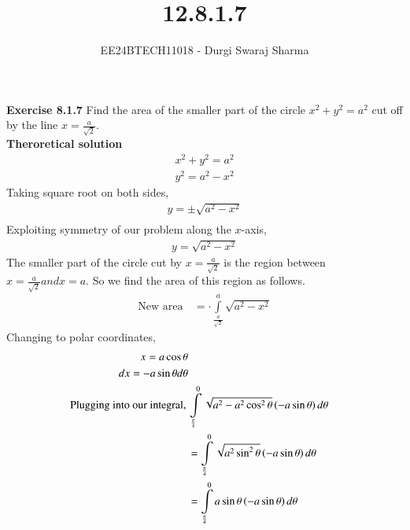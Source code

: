 \documentclass[journal]{IEEEtran}
\begin{document}

\vspace{3cm}

\title{12.8.1.7}
\author{EE24BTECH11018 - Durgi Swaraj Sharma}

{\let\newpage\relax\maketitle}
\renewcommand{\thefigure}{\theenumi}
\renewcommand{\thetable}{\theenumi}
\setlength{\intextsep}{10pt}
\renewcommand{\thetable}{\theenumi}

\textbf{Exercise 8.1.7} Find the area of the smaller part of the circle $x^2+y^2=a^2$ cut off by the line $x=\frac{a}{\sqrt{2}}$.\\
\textbf{Theroretical solution}
\begin{align}
	x^2+y^2=a^2\\
	y^2=a^2-x^2
\end{align}
Taking square root on both sides,
\begin{align}
	y = \pm\sqrt{a^2-x^2}\\
\end{align}
Exploiting symmetry of our problem along the $x$-axis,
\begin{align}
	y = \sqrt{a^2-x^2} \label{eq1}
\end{align}
The smaller part of the circle cut by $x=\frac{a}{\sqrt{2}}$ is the region between $x=\frac{a}{\sqrt{2}} and x = a$. So we find the area of this region as follows.
\begin{align}
	\text{New area}\, &= \cdot\int\limits_{\frac{a}{\sqrt{2}}}^{a} \sqrt{a^2-x^2}
\end{align}
Changing to polar coordinates,
\begin{align}
	x = a \cos\theta\\
	dx = - a \sin\theta d\theta\\
	\text{Plugging into our integral,}\, &\int\limits_{\frac{\pi}{4}}^{0} \sqrt{a^2-a^2 \cos^2\theta} \left(-a \sin\theta\right) d\theta\\
	&= \int\limits_{\frac{\pi}{4}}^{0} \sqrt{a^2 \sin^2\theta} \left(-a \sin\theta\right) d\theta\\
	&= \int\limits_{\frac{\pi}{4}}^{0} a \sin\theta \left(-a \sin\theta\right) d\theta
\end{align}
\end{document}
